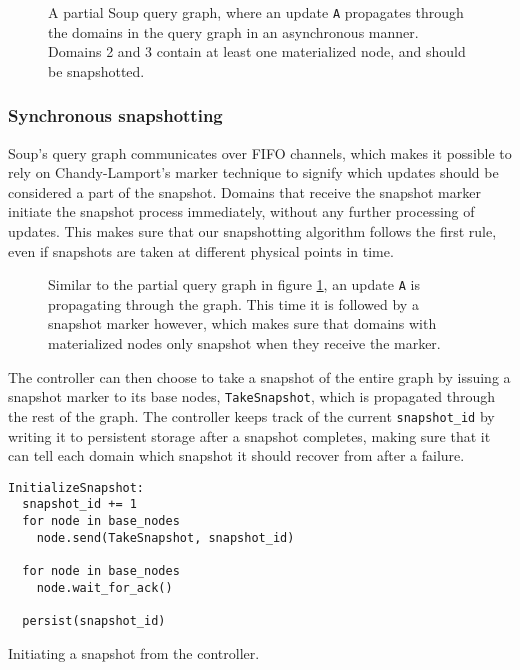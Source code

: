 \documentclass[b5paper]{report}
\begin{document}
\begin{figure}[H]
  \centering
  
  \caption{
    A partial Soup query graph, where an update \texttt{A} propagates through
    the domains in the query graph in an asynchronous manner. Domains 2 and 3
    contain at least one materialized node, and should be snapshotted.
    \label{bad-example}
  }
\end{figure}

\subsubsection{Synchronous snapshotting}
Soup's query graph communicates over FIFO channels, which makes it possible to
rely on Chandy-Lamport's marker technique to signify which updates should be
considered a part of the snapshot. Domains that receive the snapshot marker
initiate the snapshot process immediately, without any further processing of
updates. This makes sure that our snapshotting algorithm follows the first rule,
even if snapshots are taken at different physical points in time.

\begin{figure}[H]
  \centering
  
  \caption{
    Similar to the partial query graph in figure \ref{bad-example}, an update
    \texttt{A} is propagating through the graph. This time it is followed by a
    snapshot marker however, which makes sure that domains with materialized
    nodes only snapshot when they receive the marker.
    \label{good-example}
  }
\end{figure}

The controller can then choose to take a snapshot of the entire graph by issuing
a snapshot marker to its base nodes, \texttt{TakeSnapshot}, which is propagated
through the rest of the graph. The controller keeps track of the current
\texttt{snapshot\_id} by writing it to persistent storage after a snapshot
completes, making sure that it can tell each domain which snapshot it should
recover from after a failure.

\begin{listing}[H]
  \begin{verbatim}
InitializeSnapshot:
  snapshot_id += 1
  for node in base_nodes
    node.send(TakeSnapshot, snapshot_id)

  for node in base_nodes
    node.wait_for_ack()

  persist(snapshot_id)
  \end{verbatim}

  \caption{Initiating a snapshot from the controller.}
\end{listing}
\end{document}
